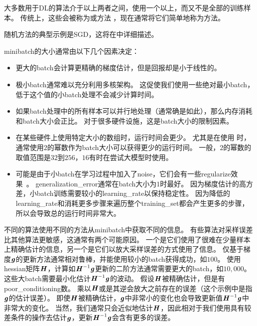 大多数用于\gls{DL}的算法介于以上两者之间，使用一个以上，而又不是全部的训练样本。
传统上，这些会被称为或方法 ，现在通常将它们简单地称为方法。


随机方法的典型示例是\gls{SGD}，这将在中详细描述。

\gls{minibatch}的大小通常由以下几个因素决定：
\begin{itemize}
    \item 更大的\gls{batch}会计算更精确的梯度估计，但是回报却是小于线性的。
    
    \item 极小\gls{batch}通常难以充分利用多核架构。
    这促使我们使用一些绝对最小\gls{batch}，低于这个值的小\gls{batch}处理不会减少计算时间。
    
    \item 如果\gls{batch}处理中的所有样本可以并行地处理（通常确是如此），那么内存消耗和\gls{batch}大小会正比。
    对于很多硬件设施，这是\gls{batch}大小的限制因素。
    
    \item 在某些硬件上使用特定大小的数组时，运行时间会更少。
    尤其是在使用\,\,时，通常使用$2$的幂数作为\gls{batch}大小可以获得更少的运行时间。
    一般，$2$的幂数的取值范围是$32$到$256$，$16$有时在尝试大模型时使用。
    \item 
    可能是由于小\gls{batch}在学习过程中加入了\gls{noise}，它们会有一些\gls{regularize}效果~\citep{Wilson-2003}。
    \gls{generalization_error}通常在\gls{batch}大小为$1$时最好。
    因为梯度估计的高方差，小\gls{batch}训练需要较小的\gls{learning_rate}以保持稳定性。
    因为降低的\gls{learning_rate}和消耗更多步骤来遍历整个\gls{training_set}都会产生更多的步骤，所以会导致总的运行时间非常大。
\end{itemize}


不同的算法使用不同的方法从\gls{minibatch}中获取不同的信息。
有些算法对采样误差比其他算法更敏感，这通常有两个可能原因。
一个是它们使用了很难在少量样本上精确估计的信息，另一个是它们以放大采样误差的方式使用了信息。
仅基于梯度$\boldsymbol{\mathit{g}}$的更新方法通常相对鲁棒，并能使用较小的\gls{batch}获得成功，如$100$。
使用\gls{hessian}矩阵$\boldsymbol{\mathit{H}}$，计算如$\boldsymbol{\mathit{H}}^{-1}\boldsymbol{\mathit{g}}$更新的二阶方法通常需要更大的\gls{batch}，如$10,000$。
这些大\gls{batch}需要最小化估计$\boldsymbol{\mathit{H}}^{-1}\boldsymbol{\mathit{g}}$的波动。
假设$\boldsymbol{\mathit{H}}$被精确估计，但是有\gls{poor_conditioning}数。
乘以$\boldsymbol{\mathit{H}}$或是其逆会放大之前存在的误差（这个示例中是指$\boldsymbol{\mathit{g}}$的估计误差）。
即使$\boldsymbol{\mathit{H}}$被精确估计，$\boldsymbol{\mathit{g}}$中非常小的变化也会导致更新值$\boldsymbol{\mathit{H}}^{-1}\boldsymbol{\mathit{g}}$中非常大的变化。
当然，我们通常只会近似地估计$\boldsymbol{\mathit{H}}$，因此相对于我们使用具有较差条件的操作去估计$\boldsymbol{\mathit{g}}$，更新$\boldsymbol{\mathit{H}}^{-1}\boldsymbol{\mathit{g}}$会含有更多的误差。

